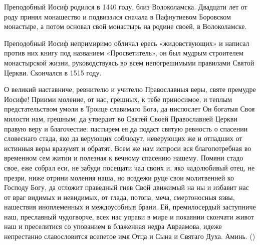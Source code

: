 \begin{mymulticols}


Преподобный Иосиф родился в 1440 году, близ Волоколамска. Двадцати лет от роду принял монашество и подвизался сначала в Пафнутиевом Боровском монастыре, а потом основал свой монастырь на родине своей, в Волоколамске.

Преподобный Иосиф непримиримо обличал ересь «жидовствующих» и написал против них книгу под названием «Просветитель», он был мудрым строителем монастырской жизни, руководствуясь во всем непогрешимыми правилами Святой Церкви. Скончался в 1515 году.



О великий наставниче, ревнителю и учителю Православныя веры, святе премудре Иосифе! Приими моление, от нас, грешных, к тебе приносимое, и теплым предстательством умоли в Троице славимаго Бога, да ниспослет Он богатыя Своя милости нам, грешным: да утвердит во Святей Своей Православней Церкви правую веру и благочестие: пастырем ея да подаст святую ревность о спасении словеснаго стада, яко да верующих соблюдут, неверующих же и отпадших от истинныя веры вразумят и обратят. Всем же нам испроси вся благопотребная во временном сем житии и полезная к вечному спасению нашему. Помяни стадо свое, еже собрал еси, не забуди посещати чад своих и, яко чадолюбивый отец, не презри, ниже отрини моления наша, но воздежи руце свои молитвенней ко Господу Богу, да отложит праведный гнев Свой движимый на ны и избавит нас от враг видимых и невидимых, от глада, потопа, меча, смертоносныя язвы, нашествия иноплеменных и междоусобныя брани. Ей, премилосердый заступниче наш, преславный чудогворче, всех нас управи в мире и покаянии скончати живот наш и преселитися со упованием в блаженная недра Авраамова, идеже непрестанно славословится всепетое имя Отца и Сына и Святаго Духа. Аминь. ()

\end{mymulticols}

\mychapterending{}


